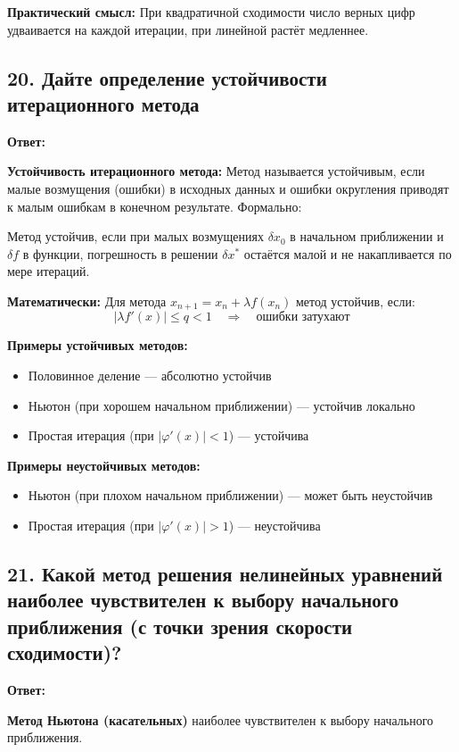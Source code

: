 \documentclass[a4paper,12pt]{article}
\begin{document}
\textbf{Практический смысл:} При квадратичной сходимости число верных цифр удваивается на каждой итерации, при линейной растёт медленнее.

\subsection*{20. Дайте определение устойчивости итерационного метода}

\textbf{Ответ:} 

\textbf{Устойчивость итерационного метода:} Метод называется устойчивым, если малые возмущения (ошибки) в исходных данных и ошибки округления приводят к малым ошибкам в конечном результате. Формально:

Метод устойчив, если при малых возмущениях $\delta x_0$ в начальном приближении и $\delta f$ в функции, погрешность в решении $\delta x^*$ остаётся малой и не накапливается по мере итераций.

\textbf{Математически:} Для метода $x_{n+1} = x_n + \lambda f(x_n)$ метод устойчив, если:
\[
    |\lambda f'(x)| \leq q < 1 \quad \Rightarrow \quad \text{ошибки затухают}
\]

\textbf{Примеры устойчивых методов:}
\begin{itemize}
    \item Половинное деление --- абсолютно устойчив
    \item Ньютон (при хорошем начальном приближении) --- устойчив локально
    \item Простая итерация (при $|\varphi'(x)| < 1$) --- устойчива
\end{itemize}

\textbf{Примеры неустойчивых методов:}
\begin{itemize}
    \item Ньютон (при плохом начальном приближении) --- может быть неустойчив
    \item Простая итерация (при $|\varphi'(x)| > 1$) --- неустойчива
\end{itemize}

\subsection*{21. Какой метод решения нелинейных уравнений наиболее чувствителен к выбору начального приближения (с точки зрения скорости сходимости)?}

\textbf{Ответ:} 

\textbf{Метод Ньютона (касательных)} наиболее чувствителен к выбору начального приближения.
\end{document}
